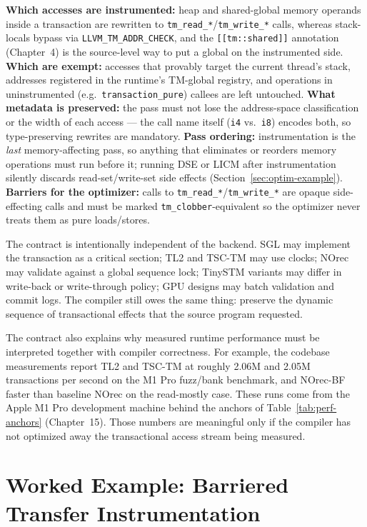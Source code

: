\textbf{Which accesses are instrumented:} heap and shared-global memory operands inside a transaction are rewritten to \texttt{tm\_read\_*}/\texttt{tm\_write\_*} calls, whereas stack-locals bypass via \texttt{LLVM\_TM\_ADDR\_CHECK}, and the \texttt{[[tm::shared]]} annotation (Chapter~4) is the source-level way to put a global on the instrumented side. \textbf{Which are exempt:} accesses that provably target the current thread's stack, addresses registered in the runtime's TM-global registry, and operations in uninstrumented (e.g.\ \texttt{transaction\_pure}) callees are left untouched. \textbf{What metadata is preserved:} the pass must not lose the address-space classification or the width of each access --- the call name itself (\texttt{i4} vs.\ \texttt{i8}) encodes both, so type-preserving rewrites are mandatory. \textbf{Pass ordering:} instrumentation is the \emph{last} memory-affecting pass, so anything that eliminates or reorders memory operations must run before it; running DSE or LICM after instrumentation silently discards read-set/write-set side effects (Section~\ref{sec:optim-example}). \textbf{Barriers for the optimizer:} calls to \texttt{tm\_read\_*}/\texttt{tm\_write\_*} are opaque side-effecting calls and must be marked \texttt{tm\_clobber}-equivalent so the optimizer never treats them as pure loads/stores.

The contract is intentionally independent of the backend. SGL may implement the transaction as a critical section; TL2 and TSC-TM may use clocks; NOrec may validate against a global sequence lock; TinySTM variants may differ in write-back or write-through policy; GPU designs may batch validation and commit logs. The compiler still owes the same thing: preserve the dynamic sequence of transactional effects that the source program requested.

The contract also explains why measured runtime performance must be interpreted together with compiler correctness. For example, the codebase measurements report TL2 and TSC-TM at roughly 2.06M and 2.05M transactions per second on the M1 Pro fuzz/bank benchmark, and NOrec-BF faster than baseline NOrec on the read-mostly case. These runs come
from the Apple M1 Pro development machine behind the anchors of
Table~\ref{tab:perf-anchors} (Chapter~15). Those numbers are meaningful only if the compiler has not optimized away the transactional access stream being measured.

\section{Worked Example: Barriered Transfer Instrumentation}
\label{sec:worked-barriered-transfer}

